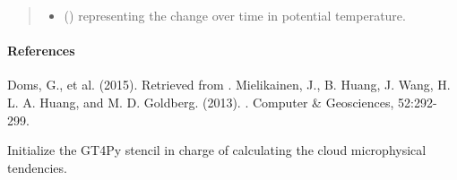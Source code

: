 \documentclass[letterpaper,10pt,english]{sphinxmanual}
\begin{document}
\begin{fulllineitems}
\begin{fulllineitems}
\begin{quote}
\begin{description}
\begin{itemize}
\item {} 
 () \textendash{}  representing the change over time in potential temperature.

\end{itemize}


\end{description}\end{quote}
\paragraph{References}

Doms, G., et al. (2015).  Retrieved from .              Mielikainen, J., B. Huang, J. Wang, H. L. A. Huang, and M. D. Goldberg. (2013).                         . Computer \& Geosciences, 52:292-299.

\end{fulllineitems}


\begin{fulllineitems}
\label{\detokenize{api:tasmania.parameterizations.slow_tendency_microphysics_kessler_wrf_saturation.SlowTendencyMicrophysicsKesslerWRFSaturation._stencil_tendency_initialize}}
Initialize the GT4Py stencil in charge of calculating the cloud microphysical tendencies.

\end{fulllineitems}



\end{fulllineitems}
\end{document}
